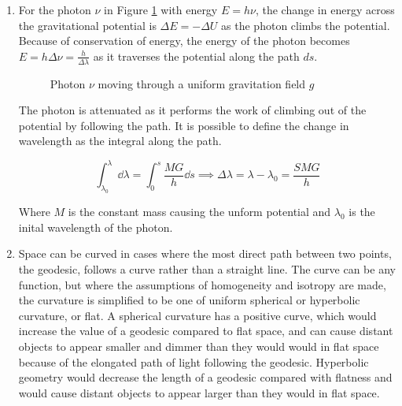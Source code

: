 \documentclass{paper}
\begin{document}
\begin{enumerate}
    \item %
      For the photon \(\nu\) in Figure \ref{fig:field} with energy 
      \(E = h \nu\), the change in energy across the gravitational potential 
      is \(\Delta{E}=-\Delta{U}\) as the photon climbs the potential. Because 
      of conservation of energy, the energy of the photon becomes 
      \(E = h \Delta{\nu} = \frac{h}{\Delta\lambda}\) as it traverses the potential
      along the path \(ds\).

      \begin{figure}[!htb]
        \begin{center}
        \end{center}

        \caption{Photon \(\nu\) moving through a uniform gravitation 
          field \(g\)}
        \label{fig:field}
      \end{figure}

      The photon is attenuated as it performs the work of climbing out of the
      potential by following the path. It is possible to define the change
      in wavelength as the integral along the path.

      \[ \int_{\lambda_{0}}^{\lambda} \dd{\lambda} = 
      \int_{0}^{s} \frac{M G}{h} \dd{s} \implies \Delta\lambda = 
      \lambda - \lambda_{0} = \frac{S M G}{h}\]

      Where \( M \) is the constant mass causing the unform potential and
      \( \lambda_{0} \) is the inital wavelength of the photon.

    \item %
      Space can be curved in cases where the most direct path between two
      points, the geodesic, follows a curve rather than a straight line. The
      curve can be any function, but where the assumptions of homogeneity and
      isotropy are made, the curvature is simplified to be one of uniform
      spherical or hyperbolic curvature, or flat. A spherical curvature has
      a positive curve, which would increase the value of a geodesic compared
      to flat space, and can cause distant objects to appear smaller and 
      dimmer than they would would in flat space because of the elongated path 
      of light following the geodesic. Hyperbolic geometry would decrease the 
      length of a geodesic compared with flatness and would cause distant
      objects to appear larger than they would in flat space.


\end{enumerate}
\end{document}

